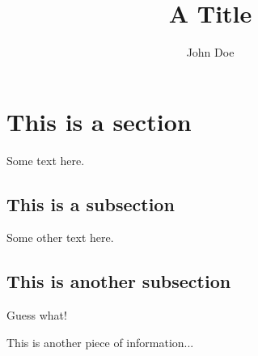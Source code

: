 \documentclass{article}
\title{A Title}
\author{John Doe}
\begin{document}
  	\maketitle
  	
  	\section{This is a section}
    Some text here.
    
    \subsection{This is a subsection}
    Some other text here.
    
    \subsection{This is another subsection}
    Guess what!
    
    This is another piece of information...
  
\end{document}
